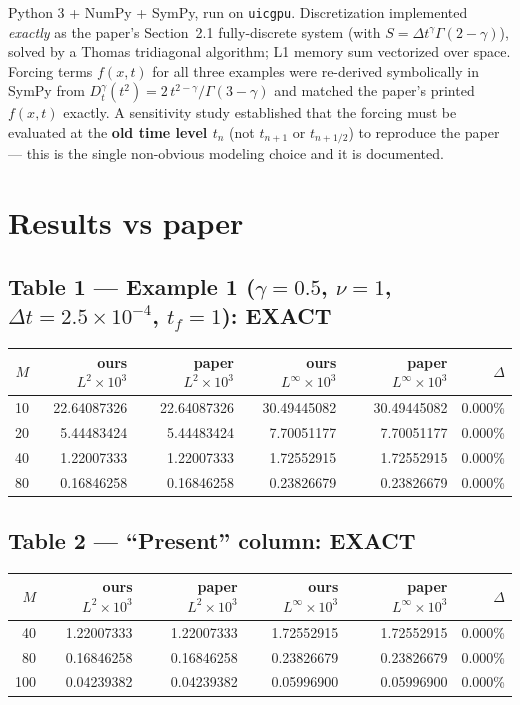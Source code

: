 \documentclass[11pt]{article}
\begin{document}
Python 3 + NumPy + SymPy, run on \texttt{uicgpu}. Discretization implemented \emph{exactly} as
the paper's Section~2.1 fully-discrete system (with $S = \Delta t^{\gamma}\Gamma(2-\gamma)$),
solved by a Thomas tridiagonal algorithm; L1 memory sum vectorized over space. Forcing terms
$f(x,t)$ for all three examples were re-derived symbolically in SymPy from
$D_t^{\gamma}(t^2)=2\,t^{2-\gamma}/\Gamma(3-\gamma)$ and matched the paper's printed $f(x,t)$
exactly. A sensitivity study established that the forcing must be evaluated at the \textbf{old
time level $t_n$} (not $t_{n+1}$ or $t_{n+1/2}$) to reproduce the paper --- this is the single
non-obvious modeling choice and it is documented.

\section{Results vs paper}

\subsection*{Table 1 --- Example 1 ($\gamma{=}0.5$, $\nu{=}1$, $\Delta t{=}2.5\!\times\!10^{-4}$, $t_f{=}1$): EXACT}

\begin{center}\small
\begin{tabular}{r r r r r r}
\toprule
$M$ & ours $L^2{\times}10^3$ & paper $L^2{\times}10^3$ & ours $L^\infty{\times}10^3$ & paper $L^\infty{\times}10^3$ & $\Delta$ \\
\midrule
10 & 22.64087326 & 22.64087326 & 30.49445082 & 30.49445082 & 0.000\% \\
20 &  5.44483424 &  5.44483424 &  7.70051177 &  7.70051177 & 0.000\% \\
40 &  1.22007333 &  1.22007333 &  1.72552915 &  1.72552915 & 0.000\% \\
80 &  0.16846258 &  0.16846258 &  0.23826679 &  0.23826679 & 0.000\% \\
\bottomrule
\end{tabular}
\end{center}

\subsection*{Table 2 --- ``Present'' column: EXACT}

\begin{center}\small
\begin{tabular}{r r r r r r}
\toprule
$M$ & ours $L^2{\times}10^3$ & paper $L^2{\times}10^3$ & ours $L^\infty{\times}10^3$ & paper $L^\infty{\times}10^3$ & $\Delta$ \\
\midrule
40 & 1.22007333 & 1.22007333 & 1.72552915 & 1.72552915 & 0.000\% \\
80 & 0.16846258 & 0.16846258 & 0.23826679 & 0.23826679 & 0.000\% \\
100 & 0.04239382 & 0.04239382 & 0.05996900 & 0.05996900 & 0.000\% \\
\bottomrule
\end{tabular}
\end{center}
\end{document}
